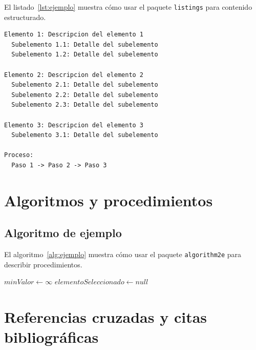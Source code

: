 \documentclass[a4paper,11pt]{report}
\begin{document}
\begin{appendices}
El listado~\ref{lst:ejemplo} muestra cómo usar el paquete \texttt{listings} para contenido estructurado.

\begin{lstlisting}[caption={Ejemplo de contenido estructurado}, label=lst:ejemplo]
Elemento 1: Descripcion del elemento 1
  Subelemento 1.1: Detalle del subelemento
  Subelemento 1.2: Detalle del subelemento
    
Elemento 2: Descripcion del elemento 2
  Subelemento 2.1: Detalle del subelemento
  Subelemento 2.2: Detalle del subelemento
  Subelemento 2.3: Detalle del subelemento
    
Elemento 3: Descripcion del elemento 3
  Subelemento 3.1: Detalle del subelemento
    
Proceso:
  Paso 1 -> Paso 2 -> Paso 3
\end{lstlisting}

\section{Algoritmos y procedimientos}

\subsection{Algoritmo de ejemplo}

El algoritmo~\ref{alg:ejemplo} muestra cómo usar el paquete \texttt{algorithm2e} para describir procedimientos.

\begin{algorithm}[htbp]
  \caption{Ejemplo de procedimiento genérico}
  \label{alg:ejemplo}
  
  \BlankLine
  $minValor \gets \infty$\;
  $elementoSeleccionado \gets null$\;
  
  \BlankLine
  
  \BlankLine
\end{algorithm}

\section{Referencias cruzadas y citas bibliográficas}


\end{appendices}
\end{document}
